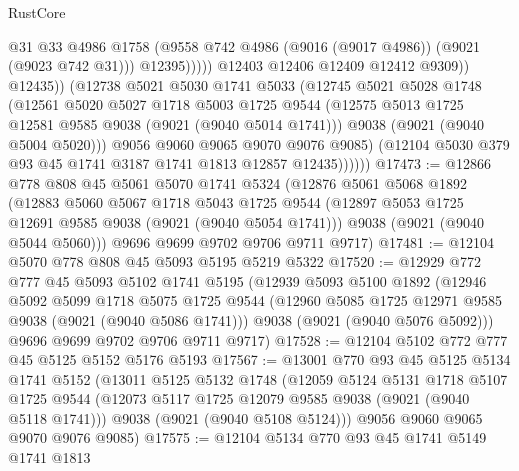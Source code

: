 \begin{lexlean}{RustCore}
\begin{coremodule}
                              @31
                              @33
                              @4986
                              @1758
                              (@9558 @742 @4986 (@9016 (@9017 @4986)) (@9021 (@9023 @742 @31)))
                              @12395)))))
                    @12403
                    @12406
                    @12409
                    @12412
                    @9309))
                @12435))
            (@12738
              @5021
              @5030
              @1741
              @5033
              (@12745
                @5021
                @5028
                @1748
                (@12561
                  @5020
                  @5027
                  @1718
                  @5003
                  @1725
                  @9544
                  (@12575 @5013 @1725 @12581 @9585 @9038 (@9021 (@9040 @5014 @1741)))
                  @9038
                  (@9021 (@9040 @5004 @5020)))
                @9056
                @9060
                @9065
                @9070
                @9076
                @9085)
              (@12104 @5030 @379 @93 @45 @1741 @3187 @1741 @1813 @12857 @12435))))))
@17473 := @12866
    @778
    @808
    @45
    @5061
    @5070
    @1741
    @5324
    (@12876
      @5061
      @5068
      @1892
      (@12883
        @5060
        @5067
        @1718
        @5043
        @1725
        @9544
        (@12897 @5053 @1725 @12691 @9585 @9038 (@9021 (@9040 @5054 @1741)))
        @9038
        (@9021 (@9040 @5044 @5060)))
      @9696
      @9699
      @9702
      @9706
      @9711
      @9717)
@17481 := @12104 @5070 @778 @808 @45 @5093 @5195 @5219 @5322
@17520 := @12929
    @772
    @777
    @45
    @5093
    @5102
    @1741
    @5195
    (@12939
      @5093
      @5100
      @1892
      (@12946
        @5092
        @5099
        @1718
        @5075
        @1725
        @9544
        (@12960 @5085 @1725 @12971 @9585 @9038 (@9021 (@9040 @5086 @1741)))
        @9038
        (@9021 (@9040 @5076 @5092)))
      @9696
      @9699
      @9702
      @9706
      @9711
      @9717)
@17528 := @12104 @5102 @772 @777 @45 @5125 @5152 @5176 @5193
@17567 := @13001
    @770
    @93
    @45
    @5125
    @5134
    @1741
    @5152
    (@13011
      @5125
      @5132
      @1748
      (@12059
        @5124
        @5131
        @1718
        @5107
        @1725
        @9544
        (@12073 @5117 @1725 @12079 @9585 @9038 (@9021 (@9040 @5118 @1741)))
        @9038
        (@9021 (@9040 @5108 @5124)))
      @9056
      @9060
      @9065
      @9070
      @9076
      @9085)
@17575 := @12104 @5134 @770 @93 @45 @1741 @5149 @1741 @1813

\end{coremodule}
\end{lexlean}
